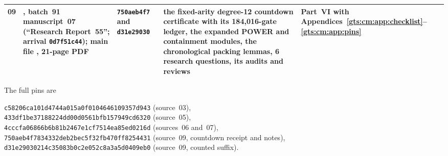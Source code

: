 \documentclass[11pt,letterpaper]{article}
\theoremstyle{definition}
\theoremstyle{remark}
\begin{document}
\begin{center}
\begin{longtable}{@{}L{0.07\textwidth}L{0.24\textwidth}L{0.2\textwidth}L{0.2\textwidth}L{0.17\textwidth}@{}}
09 & , batch~91 manuscript~07 (``Research Report~55''; arrival \texttt{0d7f51c44}); main file , 21-page PDF & \texttt{750aeb4f7} and \texttt{d31e29030} & the fixed-arity degree-12 countdown certificate with its 184,016-gate ledger, the expanded POWER and containment modules, the chronological packing lemmas, 6 research questions, its audits and reviews & Part~VI with Appendices~\ref{gts:cm:app:checklist}--\ref{gts:cm:app:pins}\\
\bottomrule
\end{longtable}
\end{center}

The full pins are
\begin{center}\small
\texttt{c58206ca101d4744a015a0f0104646109357d943} (source~03),\\
\texttt{433df1be37188224dd00d0561bfb157949cd6320} (source~05),\\
\texttt{4cccfa06866b6b81b2467e1cf7514ea85ed0216d} (sources~06 and~07),\\
\texttt{750aeb4f7834332deb2bec5f32fb470ff8254431} (source~09, countdown receipt and notes),\\
\texttt{d31e29030214c35083b0c2e052c8a3a5d0409eb0} (source~09, counted suffix).
\end{center}
\end{document}
